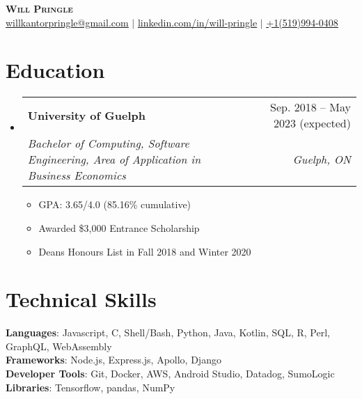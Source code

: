 \documentclass[letterpaper,11pt]{article}
\makeatletter
\newcommand{\resumeItem}[1]{
  \item\small{
    {#1 \vspace{-2pt}}
  }
}
\newcommand{\resumeSubheading}[4]{
  \vspace{-2pt}\item
    \begin{tabular*}{0.97\textwidth}[t]{l@{\extracolsep{\fill}}r}
      \textbf{#1} & #2 \\
      \textit{\small#3} & \textit{\small #4} \\
    \end{tabular*}\vspace{-7pt}
}
\newcommand{\resumeSubHeadingListStart}{\begin{itemize}[leftmargin=0.15in, label={}]}
\newcommand{\resumeSubHeadingListEnd}{\end{itemize}}
\newcommand{\resumeItemListStart}{\begin{itemize}}
\newcommand{\resumeItemListEnd}{\end{itemize}\vspace{-5pt}}
\makeatother
\begin{document}
\begin{center}
    \textbf{\Huge \scshape Will Pringle} \\ \vspace{1pt}
    \small \href{mailto:willkantorpringle@gmail.com}{\underline{willkantorpringle@gmail.com}} $|$ 
    \href{https://www.linkedin.com/in/will-pringle/}{\underline{linkedin.com/in/will-pringle}} $|$
    \href{tel:+15199940408}{\underline{+1(519)994-0408}}
\end{center}


\section{Education}
  \resumeSubHeadingListStart
    \resumeSubheading
      {University of Guelph}{Sep. 2018 -- May 2023 (expected)}
      {Bachelor of Computing, Software Engineering, Area of Application in Business Economics}{Guelph, ON}
      \resumeItemListStart
        \resumeItem{GPA: 3.65/4.0 (85.16\% cumulative)}
        \resumeItem{Awarded \$3,000 Entrance Scholarship}
        \resumeItem{Deans Honours List in Fall 2018 and Winter 2020}
      \resumeItemListEnd
  \resumeSubHeadingListEnd


\section{Technical Skills}
  \begin{itemize}[leftmargin=0.15in, label={}]
    \small{\item{
      \textbf{Languages}{: Javascript, C, Shell/Bash, Python, Java, Kotlin, SQL, R, Perl, GraphQL, WebAssembly} \\
      \textbf{Frameworks}{: Node.js, Express.js, Apollo, Django} \\
      \textbf{Developer Tools}{: Git, Docker, AWS, Android Studio, Datadog, SumoLogic} \\
      \textbf{Libraries}{: Tensorflow, pandas, NumPy} \\
    }}
  \end{itemize}


\end{document}
